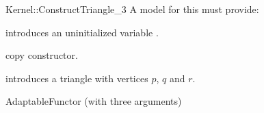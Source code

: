 \begin{ccRefFunctionObjectConcept}{Kernel::ConstructTriangle_3}
A model for this must provide:



\ccHidden {}
             {introduces an uninitialized variable .}

\ccHidden {}
            {copy constructor.}

            {introduces a triangle  with vertices $p$, $q$ and $r$.}

\ccRefines
AdaptableFunctor (with three arguments)

\ccSeeAlso
{}\\

\end{ccRefFunctionObjectConcept}
